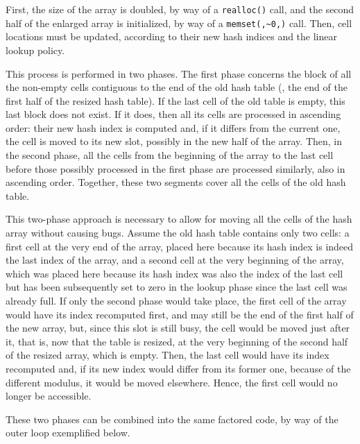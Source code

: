 First, the size of the array is doubled, by way of a
\mbox{\texttt{realloc()}} call, and the second half of the enlarged
array is initialized, by way of a \mbox{\texttt{memset(,\~{}0,)}} call.
Then, cell locations must be updated, according to their new hash
indices and the linear lookup policy.

This process is performed in two phases. The first phase concerns the
block of all the non-empty cells contiguous to the end of the old hash
table (\ie, the end of the first half of the resized hash table). If
the last cell of the old table is empty, this last block does not
exist. If it does, then all its cells are processed in ascending
order: their new hash index is computed and, if it differs from the
current one, the cell is moved to its new slot, possibly in the new
half of the array. Then, in the second phase, all the cells from the
beginning of the array to the last cell before those possibly
processed in the first phase are processed similarly, also in
ascending order. Together, these two segments cover all the cells of
the old hash table.

This two-phase approach is necessary to allow for moving all the cells
of the hash array without causing bugs. Assume the old hash table
contains only two cells: a first cell at the very end of the array,
placed here because its hash index is indeed the last index of the
array, and a second cell at the very beginning of the array, which was
placed here because its hash index was also the index of the last cell
but has been subsequently set to zero in the lookup phase since the
last cell was already full. If only the second phase would take place,
the first cell of the array would have its index recomputed first, and
may still be the end of the first half of the new array, but, since
this slot is still busy, the cell would be moved just after it, that
is, now that the table is resized, at the very beginning of the second
half of the resized array, which is empty. Then, the last cell would
have its index recomputed and, if its new index would differ from its
former one, because of the different modulus, it would be moved
elsewhere. Hence, the first cell would no longer be accessible.

These two phases can be combined into the same factored code, by way
of the outer loop exemplified below.

